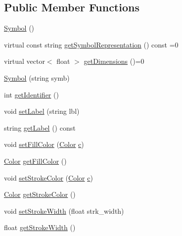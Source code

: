 \subsection*{Public Member Functions}
\begin{DoxyCompactItemize}
\item 
\mbox{\hyperlink{classbridges_1_1_symbol_a4e1ce195ffc6c99e7f597ef63ed40aa6}{Symbol}} ()
\item 
virtual const string \mbox{\hyperlink{classbridges_1_1_symbol_ab4dd31fbc736b2e58e8b8bb8446eac73}{get\+Symbol\+Representation}} () const =0
\item 
virtual vector$<$ float $>$ \mbox{\hyperlink{classbridges_1_1_symbol_a6eb190dc71b31b344b7610a07c6dc1d5}{get\+Dimensions}} ()=0
\item 
\mbox{\hyperlink{classbridges_1_1_symbol_a047f3b1508fb62efdca8b688f462a866}{Symbol}} (string symb)
\item 
int \mbox{\hyperlink{classbridges_1_1_symbol_a6006dfc7fcaeff3dbead8bcf647ccff6}{get\+Identifier}} ()
\item 
void \mbox{\hyperlink{classbridges_1_1_symbol_afd181fe1e860542548efc4244e06f609}{set\+Label}} (string lbl)
\item 
string \mbox{\hyperlink{classbridges_1_1_symbol_a6d19ee38cdb8a07a19cf53840e93cbbb}{get\+Label}} () const
\item 
void \mbox{\hyperlink{classbridges_1_1_symbol_a20315217d30c3c747b5b6da60c08c2c9}{set\+Fill\+Color}} (\mbox{\hyperlink{classbridges_1_1_color}{Color}} \mbox{\hyperlink{namespacebridges_acfb0a4f7877d8f63de3e6862004c50eda4a8a08f09d37b73795649038408b5f33}{c}})
\item 
\mbox{\hyperlink{classbridges_1_1_color}{Color}} \mbox{\hyperlink{classbridges_1_1_symbol_affd9e9f49524a920d53a490782fab9c9}{get\+Fill\+Color}} ()
\item 
void \mbox{\hyperlink{classbridges_1_1_symbol_a813783a031eb5fcc841a549be384f876}{set\+Stroke\+Color}} (\mbox{\hyperlink{classbridges_1_1_color}{Color}} \mbox{\hyperlink{namespacebridges_acfb0a4f7877d8f63de3e6862004c50eda4a8a08f09d37b73795649038408b5f33}{c}})
\item 
\mbox{\hyperlink{classbridges_1_1_color}{Color}} \mbox{\hyperlink{classbridges_1_1_symbol_ad783260351a4e85612807d039565880d}{get\+Stroke\+Color}} ()
\item 
void \mbox{\hyperlink{classbridges_1_1_symbol_a29e8e8b80ea1aba0a99abdacd7c8ec17}{set\+Stroke\+Width}} (float strk\+\_\+width)
\item 
float \mbox{\hyperlink{classbridges_1_1_symbol_a59ee674a1eaf79c7611ef8377cba2d0b}{get\+Stroke\+Width}} ()

\end{DoxyCompactItemize}
